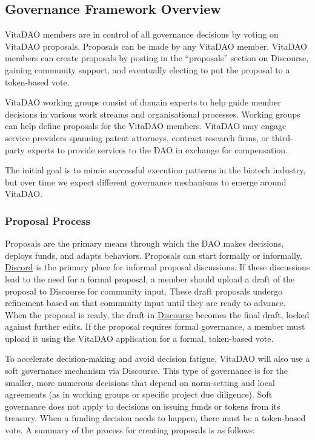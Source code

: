 \documentclass[10pt,letterpaper]{article}
\begin{document}
\subsection{Governance Framework Overview}
VitaDAO members are in control of all governance decisions by voting on VitaDAO proposals. Proposals can be made by any VitaDAO member. VitaDAO members can create proposals by posting in the “proposals” section on Discourse, gaining community support, and eventually electing to put the proposal to a token-based vote. 

VitaDAO working groups consist of domain experts to help guide member decisions in various work streams and organisational processes. Working groups can help define proposals for the VitaDAO members. VitaDAO may engage service providers spanning patent attorneys, contract research firms, or third-party experts to provide services to the DAO in exchange for compensation.

The initial goal is to mimic successful execution patterns in the biotech industry, but over time we expect different governance mechanisms to emerge around VitaDAO.

\subsubsection{Proposal Process}
Proposals are the primary means through which the DAO makes decisions, deploys funds, and adapts behaviors. Proposals can start formally or informally. \href{https://github.com/discord}{Discord} is the primary place for informal proposal discussions. If these discussions lead to the need for a formal proposal, a member should upload a draft of the proposal to Discourse for community input. These draft proposals undergo refinement based on that community input until they are ready to advance. When the proposal is ready, the draft in \href{https://github.com/discourse/discourse}{Discourse} becomes the final draft, locked against further edits. If the proposal requires formal governance, a member must upload it using the VitaDAO application for a formal, token-based vote. 

To accelerate decision-making and avoid decision fatigue, VitaDAO will also use a soft governance mechanism via Discourse. This type of governance is for the smaller, more numerous decisions that depend on norm-setting and local agreements (as in working groups or specific project due diligence). Soft governance does not apply to decisions on issuing funds or tokens from its treasury. When a funding decision needs to happen, there must be a token-based vote. A summary of the process for creating proposals is as follows:
\end{document}

